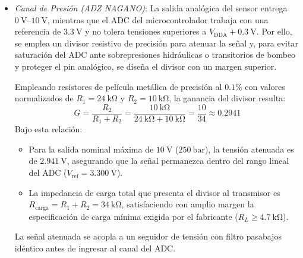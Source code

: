\begin{itemize}
\begin{enumerate}
    \end{enumerate}
    Para respetar rigurosamente la recomendación de la hoja de datos de mantener
        una corriente de cursor despreciable ($I_c \ll
        \qty{0.1}{\micro\ampere}$) y anular cualquier error de carga sobre la
        pista resistiva, se interpone un amplificador operacional en
        configuración de seguidor de tensión (buffer con ganancia unitaria $G =
        1$) que presenta una impedancia de entrada elevada. A la salida del buffer se implementa un filtro pasabajos RC anti-aliasing pasivo de primer orden con resistencia $R_f = \qty{1}{\kilo\ohm}$ y capacitor cerámico $C_f = \qty{100}{\nano\farad}$, fijando una frecuencia de corte teórica según la Ecuación~\ref{eq.ej1:filtro_fc}:
    \begin{equation}
        f_c = \frac{1}{2 \pi R_f C_f}
        \label{eq.ej1:filtro_fc}
    \end{equation}
    Calculando con los valores adoptados, resulta:
    \[
        f_c = \frac{1}{2 \pi \cdot \qty{1}{\kilo\ohm} \cdot \qty{100}{\nano\farad}} \approx \qty{1.59}{\kilo\hertz}
    \]
    \item \emph{Canal de Presión (ADZ NAGANO)}: La salida analógica del sensor entrega $\qtyrange{0}{10}{\volt}$, mientras que el ADC del microcontrolador trabaja con una referencia de $\qty{3.3}{\volt}$ y no tolera tensiones superiores a $V_{\text{DDA}} + \qty{0.3}{\volt}$. Por ello, se emplea un divisor resistivo de precisión para atenuar la señal y, para evitar saturación del ADC ante sobrepresiones hidráulicas o transitorios de bombeo y proteger el pin analógico, se diseña el divisor con un margen superior.

    Empleando resistores de película metálica de precisión al $0.1\%$ con valores normalizados de $R_1 = \qty{24}{\kilo\ohm}$ y $R_2 = \qty{10}{\kilo\ohm}$, la ganancia del divisor resulta:
    \begin{equation}
        G = \frac{R_2}{R_1 + R_2} = \frac{\qty{10}{\kilo\ohm}}{\qty{24}{\kilo\ohm} + \qty{10}{\kilo\ohm}} = \frac{10}{34} \approx 0.2941
        \label{eq.ej1:divisor_presion}
    \end{equation}
    Bajo esta relación:
    \begin{itemize}
        \item Para la salida nominal máxima de $\qty{10}{\volt}$ ($\qty{250}{\bar}$), la tensión atenuada es de $\qty{2.941}{\volt}$, asegurando que la señal permanezca dentro del rango lineal del ADC ($V_{\text{ref}} = \qty{3.300}{\volt}$).
        \item La impedancia de carga total que presenta el divisor al transmisor es $R_{\text{carga}} = R_1 + R_2 = \qty{34}{\kilo\ohm}$, satisfaciendo con amplio margen la especificación de carga mínima exigida por el fabricante ($R_L \ge \qty{4.7}{\kilo\ohm}$).
    \end{itemize}
    La señal atenuada se acopla a un seguidor de tensión con filtro pasabajos idéntico antes de ingresar al canal del ADC.
\end{itemize}

